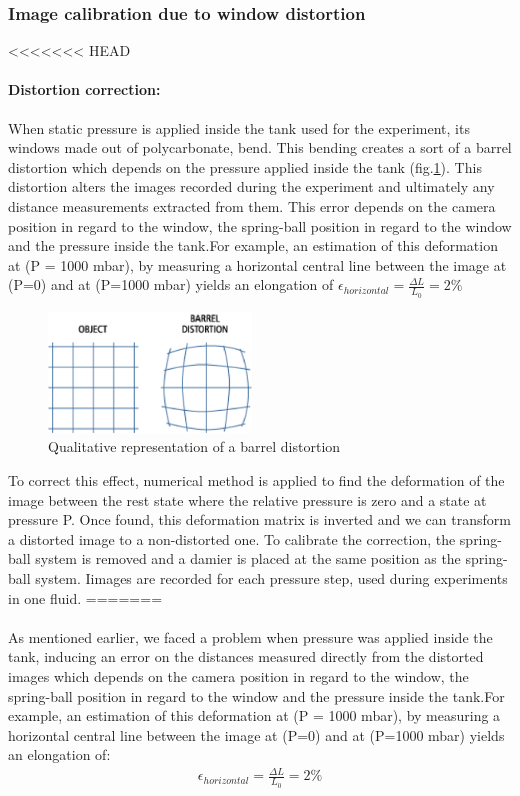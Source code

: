 \subsubsection{Image calibration due to window distortion}
<<<<<<< HEAD
\paragraph{Distortion correction:}
When static pressure is applied inside the tank used for the experiment, its windows made out of polycarbonate, bend. This bending creates a sort of a barrel distortion which depends on the pressure applied inside the tank (fig.\ref{fig:barrel_distortion}). This distortion alters the images recorded during the experiment and ultimately any distance measurements extracted from them. This error depends on the camera position in regard to the window, the spring-ball position in regard to the window and the pressure inside the tank.For example, an estimation of this deformation at (P = 1000 mbar), by measuring a horizontal central line between the image at (P=0) and at (P=1000 mbar) yields an elongation of $\epsilon_{horizontal} = \frac{\Delta L}{L_0} = 2\%$
\begin{figure}[H] %
	\centering%
  \includegraphics[width=0.48\textwidth]{figures/Chapter_1/barrel_effect.png}
	\caption{Qualitative representation of a barrel distortion}
	\label{fig:barrel_distortion}
\end{figure}
 To correct this effect, numerical method is applied to find the deformation of the image between the rest state where the relative pressure is zero and a state at pressure P. Once found, this deformation matrix is inverted and we can transform a distorted image to a non-distorted one.
To calibrate the correction, the spring-ball system is removed and a damier is placed at the same position as the spring-ball system. Iimages are recorded for each pressure step, used during experiments in one fluid.
=======
\paragraph{}
As mentioned earlier, we faced a problem when pressure was applied inside the tank, inducing an error on the distances measured directly from the distorted images which depends on the camera position in regard to the window, the spring-ball position in regard to the window and the pressure inside the tank.For example, an estimation of this deformation at (P = 1000 mbar), by measuring a horizontal central line between the image at (P=0) and at (P=1000 mbar) yields an elongation of:
\begin{align}
	\epsilon_{horizontal} = \frac{\Delta L}{L_0} = 2\%
\end{align}
